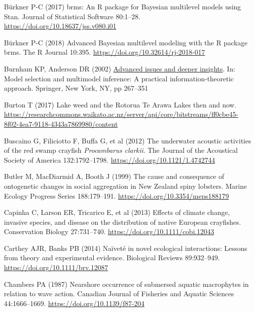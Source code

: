 \documentclass[
  12pt,
  a4paper,
  oneside]{scrbook}
\newlength{\cslhangindent}
\newenvironment{CSLReferences}[2] %
 {\begin{list}{}{%
  \setlength{\itemindent}{0pt}
  \setlength{\leftmargin}{0pt}
  \setlength{\parsep}{0pt}
  \ifodd #1
   \setlength{\leftmargin}{\cslhangindent}
   \setlength{\itemindent}{-1\cslhangindent}
  \fi
  \setlength{\itemsep}{#2\baselineskip}}}
 {\end{list}}
\renewenvironment{CSLReferences}[2]
   {\begin{list}{}{%
    \setlength{\itemindent}{0pt}
    \setlength{\leftmargin}{0pt}
    \setlength{\parsep}{0pt}
    \ifodd #1
     \setlength{\leftmargin}{\cslhangindent}
     \setlength{\itemindent}{-1\cslhangindent}
    \fi
    \setlength{\itemsep}{0.3\baselineskip}}}
   {\end{list}}%
\begin{document}
\begin{CSLReferences}{1}{1}
Bürkner P-C (2017) {brms}: An {R} package for {B}ayesian multilevel
models using {Stan}. Journal of Statistical Software 80:1--28.
\url{https://doi.org/10.18637/jss.v080.i01}

Bürkner P-C (2018) Advanced {B}ayesian multilevel modeling with the {R}
package brms. The R Journal 10:395.
\url{https://doi.org/10.32614/rj-2018-017}

Burnham KP, Anderson DR (2002)
\href{https://doi.org/10.1007/978-0-387-22456-5_6}{Advanced issues and
deeper insights}. In: Model selection and multimodel inference: A
practical information-theoretic approach. Springer, New York, NY, pp
267--351

Burton T (2017) Lake weed and the {Rotorua Te Arawa Lakes} then and now.
\url{https://researchcommons.waikato.ac.nz/server/api/core/bitstreams/ff0cbe45-8f02-4ea7-9118-4343a7869980/content}

Buscaino G, Filiciotto F, Buffa G, et al (2012) The underwater acoustic
activities of the red swamp crayfish {\emph{Procambarus clarkii}}. The
Journal of the Acoustical Society of America 132:1792--1798.
\url{https://doi.org/10.1121/1.4742744}

Butler M, MacDiarmid A, Booth J (1999) The cause and consequence of
ontogenetic changes in social aggregation in {New Zealand} spiny
lobsters. Marine Ecology Progress Series 188:179--191.
\url{https://doi.org/10.3354/meps188179}

Capinha C, Larson ER, Tricarico E, et al (2013) Effects of climate
change, invasive species, and disease on the distribution of native
{European} crayfishes. Conservation Biology 27:731--740.
\url{https://doi.org/10.1111/cobi.12043}

Carthey AJR, Banks PB (2014) Naïveté in novel ecological interactions:
Lessons from theory and experimental evidence. Biological Reviews
89:932--949. \url{https://doi.org/10.1111/brv.12087}

Chambers PA (1987) Nearshore occurrence of submersed aquatic macrophytes
in relation to wave action. Canadian Journal of Fisheries and Aquatic
Sciences 44:1666--1669. \url{https://doi.org/10.1139/f87-204}


\end{CSLReferences}
\end{document}
